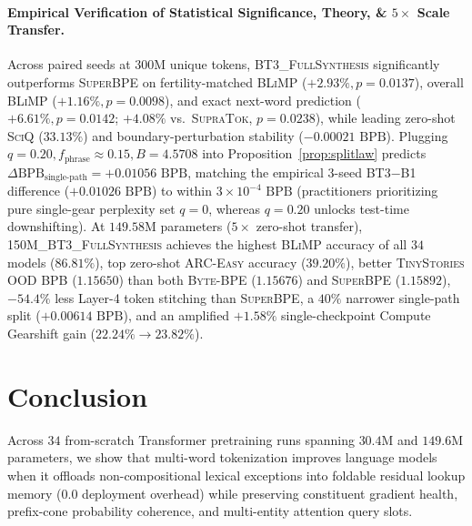 \documentclass[11pt,a4paper]{article}
\begin{document}
\paragraph{Empirical Verification of Statistical Significance, Theory, \& $5\times$ Scale Transfer.}
Across paired seeds at $300\text{M}$ unique tokens, \textsc{BT3\_FullSynthesis} significantly outperforms \textsc{SuperBPE} on fertility-matched \textsc{BLiMP} ($+2.93\%, p=0.0137$), overall \textsc{BLiMP} ($+1.16\%, p=0.0098$), and exact next-word prediction ($+6.61\%, p=0.0142$; $+4.08\%$ vs.\ \textsc{SupraTok}, $p=0.0238$), while leading zero-shot \textsc{SciQ} ($33.13\%$) and boundary-perturbation stability ($-0.00021\text{ BPB}$). Plugging $q=0.20, f_{\text{phrase}}\approx 0.15, B=4.5708$ into Proposition~\ref{prop:splitlaw} predicts $\Delta\text{BPB}_{\text{single-path}} = +0.01056\text{ BPB}$, matching the empirical 3-seed \textsc{BT3}$-$\textsc{B1} difference ($+0.01026\text{ BPB}$) to within $3\times 10^{-4}\text{ BPB}$ (practitioners prioritizing pure single-gear perplexity set $q=0$, whereas $q=0.20$ unlocks test-time downshifting). At $149.58\text{M}$ parameters ($5\times$ zero-shot transfer), \textsc{150M\_BT3\_FullSynthesis} achieves the highest \textsc{BLiMP} accuracy of all $34$ models ($86.81\%$), top zero-shot \textsc{ARC-Easy} accuracy ($39.20\%$), better \textsc{TinyStories} OOD BPB ($1.15650$) than both \textsc{Byte-BPE} ($1.15676$) and \textsc{SuperBPE} ($1.15892$), $-54.4\%$ less Layer-4 token stitching than \textsc{SuperBPE}, a $40\%$ narrower single-path split ($+0.00614\text{ BPB}$), and an amplified $+1.58\%$ single-checkpoint Compute Gearshift gain ($22.24\% \to 23.82\%$).

\section{Conclusion}
Across $34$ from-scratch Transformer pretraining runs spanning $30.4\text{M}$ and $149.6\text{M}$ parameters, we show that multi-word tokenization improves language models when it offloads non-compositional lexical exceptions into foldable residual lookup memory ($0.0$ deployment overhead) while preserving constituent gradient health, prefix-cone probability coherence, and multi-entity attention query slots.
\end{document}
